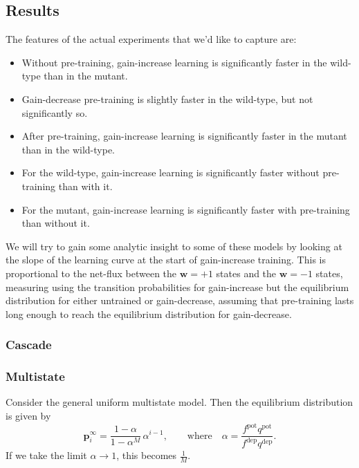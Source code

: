 \documentclass[12pt]{article}
\newcommand{\pr}{\mathbf{p}}
\newcommand{\eq}{\pr^\infty}
\newcommand{\w}{\mathbf{w}}
\newcommand{\pot}{^{\text{pot}}}
\newcommand{\dep}{^{\text{dep}}}
\begin{document}
\subsection{Results}\label{sec:results}

The features of the actual experiments that we'd like to capture are:
\begin{itemize}
  \item Without pre-training, gain-increase learning is significantly faster in the wild-type than in the mutant.
  \item Gain-decrease pre-training is slightly faster in the wild-type, but not significantly so.
  \item After pre-training, gain-increase learning is significantly faster in the mutant than in the wild-type.
  \item For the wild-type, gain-increase learning is significantly faster without pre-training than with it.
  \item For the mutant, gain-increase learning is significantly faster with pre-training than without it.
\end{itemize}

We will try to gain some analytic insight to some of these models by looking at the slope of the learning curve at the start of gain-increase training.
This is proportional to the net-flux between the $\w=+1$ states and the $\w=-1$ states, measuring using the transition probabilities for gain-increase but the equilibrium distribution for either untrained or gain-decrease, assuming that pre-training lasts long enough to reach the equilibrium distribution for gain-decrease.


\subsubsection{Cascade}\label{sec:cascade}


\subsubsection{Multistate}\label{sec:multistate}


Consider the general uniform multistate model. 
Then the equilibrium distribution is given by
%
\begin{equation}\label{eq:mutltieq}
  \eq_i = \frac{1-\alpha}{1-\alpha^M}\,\alpha^{i-1},
  \qquad \text{where} \quad
  \alpha=\frac{f\pot q\pot}{f\dep q\dep}.
\end{equation}
%
If we take the limit $\alpha\rightarrow1$, this becomes $\frac{1}{M}$.
\end{document}
